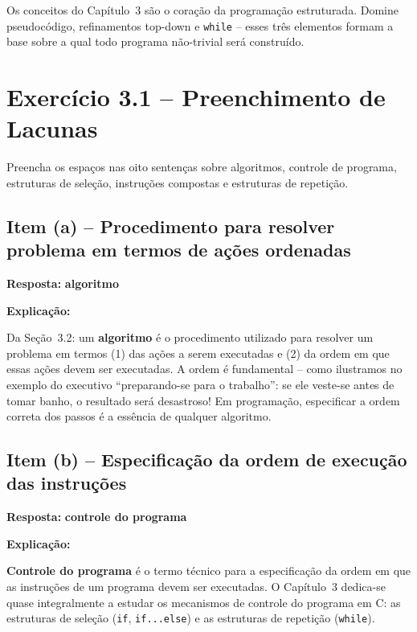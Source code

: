 \documentclass[12pt,a4paper]{article}
\begin{document}
\begin{boaprática}
  Os conceitos do Capítulo~3 são o coração da programação estruturada.
  Domine pseudocódigo, refinamentos top-down e \texttt{while} -- esses três
  elementos formam a base sobre a qual todo programa não-trivial será construído.
\end{boaprática}

\tableofcontents\newpage

\section{Exercício 3.1 -- Preenchimento de Lacunas}

\begin{enunciadoBox}[Enunciado 3.1]
Preencha os espaços nas oito sentenças sobre algoritmos, controle de programa,
estruturas de seleção, instruções compostas e estruturas de repetição.
\end{enunciadoBox}

\subsection*{Item (a) -- Procedimento para resolver problema em termos de ações ordenadas}

\begin{respostabox}
\textbf{Resposta:} \textcolor{deitelblue}{\textbf{algoritmo}}

\medskip\textbf{Explicação:}

Da Seção~3.2: um \textbf{algoritmo} é o procedimento utilizado para resolver um problema
em termos (1) das ações a serem executadas e (2) da ordem em que essas ações devem
ser executadas. A ordem é fundamental -- como ilustramos no exemplo do executivo
``preparando-se para o trabalho'': se ele veste-se antes de tomar banho, o resultado
será desastroso! Em programação, especificar a ordem correta dos passos é a essência
de qualquer algoritmo.
\end{respostabox}

\subsection*{Item (b) -- Especificação da ordem de execução das instruções}

\begin{respostabox}
\textbf{Resposta:} \textcolor{deitelblue}{\textbf{controle do programa}}

\medskip\textbf{Explicação:}

\textbf{Controle do programa} é o termo técnico para a especificação da ordem em
que as instruções de um programa devem ser executadas. O Capítulo~3 dedica-se quase
integralmente a estudar os mecanismos de controle do programa em C: as estruturas
de seleção (\texttt{if}, \texttt{if...else}) e as estruturas de repetição (\texttt{while}).
\end{respostabox}
\end{document}
